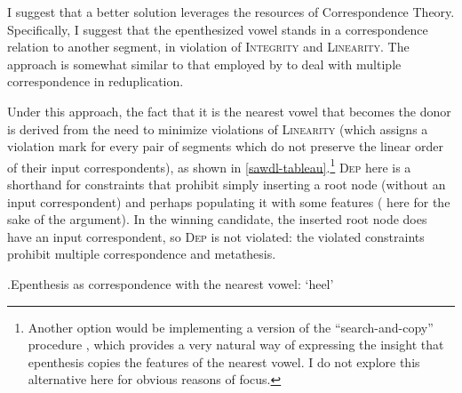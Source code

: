 I suggest that a better solution leverages the resources of Correspondence Theory. Specifically, I suggest that the epenthesized vowel stands in a correspondence relation to another segment, in violation of \textsc{Integrity} \citep[\egm][]{fukazawa98:_lexic} and \textsc{Linearity}. The approach is somewhat similar to that employed by \citet{struijke00:_exist} to deal with multiple correspondence in reduplication.

Under this approach, the fact that it is the nearest vowel that becomes the donor is derived from the need to minimize violations of \textsc{Linearity} (which assigns a violation mark for every pair of segments which do not preserve the linear order of their input correspondents), as shown in \ref{sawdl-tableau}.\footnote{Another option would be implementing a version of the \enquote{search\hyp and\hyp copy} procedure \citep{nevins10:_local,samuels11:_phonol}, which provides a very natural way of expressing the insight that epenthesis copies the features of the nearest vowel. I do not explore this alternative here for obvious reasons of focus.} \textsc{Dep} here is a shorthand for constraints that prohibit simply inserting a root node (without an input correspondent) and perhaps populating it with some features ( here for the sake of the argument). In the winning candidate, the inserted root node does have an input correspondent, so \textsc{Dep} is not violated: the violated constraints prohibit multiple correspondence and metathesis.

\ex.\label{sawdl-tableau}Epenthesis as correspondence with the nearest vowel: \ipa{[ˈsoudul]} `heel'\\
\begin{OTtableau}{4}
\OTcandrow{[ˈso$_{1}$u$_{2}$dl]}{*!,,,}
\end{OTtableau}

